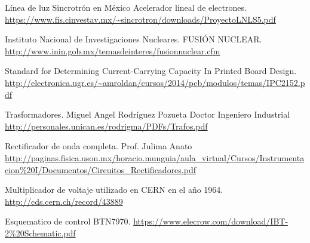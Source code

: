 \documentclass[twoside,11pt]{Latex/Classes/thesisUMSNH}
\begin{document}


\begin{thebibliography}{2}
   Línea de luz Sincrotrón en México
Acelerador lineal de electrones. \url{https://www.fis.cinvestav.mx/~sincrotron/downloads/ProyectoLNLS5.pdf}

Instituto Nacional de Investigaciones Nucleares. FUSIÓN NUCLEAR. \url{http://www.inin.gob.mx/temasdeinteres/fusionnuclear.cfm}

Standard for Determining Current-Carrying Capacity In Printed Board Design. \url{http://electronica.ugr.es/~amroldan/cursos/2014/pcb/modulos/temas/IPC2152.pdf}

Trasformadores. Miguel Angel Rodríguez Pozueta
Doctor Ingeniero Industrial \url{http://personales.unican.es/rodrigma/PDFs/Trafos.pdf}

Rectificador de onda completa. Prof. Julima Anato \url{http://paginas.fisica.uson.mx/horacio.munguia/aula_virtual/Cursos/Instrumentacion\%20I/Documentos/Circuitos_Rectificadores.pdf}

Multiplicador de voltaje utilizado en CERN en el año 1964. \url{http://cds.cern.ch/record/43889}

Esquematico de control BTN7970. \url{https://www.elecrow.com/download/IBT-2\%20Schematic.pdf}
\end{thebibliography}
\end{document}

